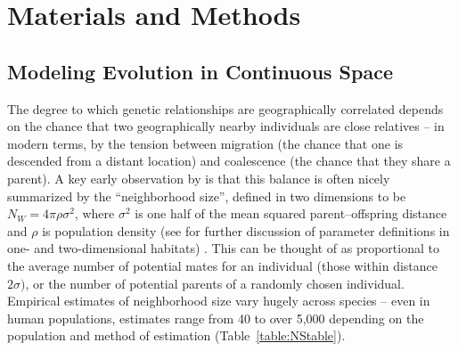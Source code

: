\documentclass[10pt,twoside,lineno,hidelinks]{preprint}
\begin{document}
\section{Materials and Methods}
\label{sec:materials:methods}

\subsection{Modeling Evolution in Continuous Space}

The degree to which genetic relationships are geographically correlated
depends on the chance that two geographically nearby individuals are close relatives
-- in modern terms, by the tension between
migration (the chance that one is descended from a distant location)
and coalescence (the chance that they share a parent).
A key early observation by \citet{Wright1946} is that this balance is often nicely summarized by the ``neighborhood size'',
defined in two dimensions to be $N_W = 4 \pi \rho \sigma^2$,
where $\sigma^2$ is one half of the mean squared parent--offspring distance
and $\rho$ is population density
(see \citet{Rousset1997} for further discussion of parameter definitions in one- and two-dimensional habitats) . 
This can be thought of as proportional to the average number of potential mates for an individual (those within distance $2 \sigma)$,
or the number of potential parents of a randomly chosen individual. Empirical estimates of neighborhood size vary hugely across species
-- even in human populations,
estimates range from 40 to over 5,000 depending on the population and method of estimation (Table~\ref{table:NStable}).
\end{document}
